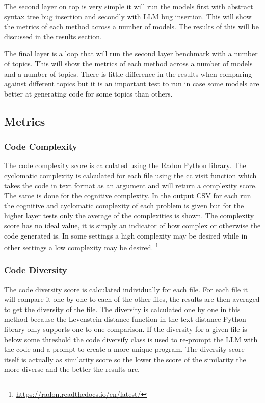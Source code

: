 \documentclass[12pt]{extarticle}
\begin{document}
The second layer on top is very simple it will run the models first with abstract syntax tree bug insertion and secondly with LLM bug insertion. This will show the metrics of each method across a number of models. The results of this will be discussed in the results section.

The final layer is a loop that will run the second layer benchmark with a number of topics. This will show the metrics of each method across a number of models and a number of topics. There is little difference in the results when comparing against different topics but it is an important test to run in case some models are better at generating code for some topics than others.

\subsection{Metrics}
\subsubsection{Code Complexity}

The code complexity score is calculated using the Radon Python library. The cyclomatic complexity \cite{esposito2024} is calculated for each file using the cc visit function which takes the code in text format as an argument and will return a complexity score. The same is done for the cognitive complexity. In the output CSV for each run the cognitive and cyclomatic complexity of each problem is given but for the higher layer tests only the average of the complexities is shown. The complexity score has no ideal value, it is simply an indicator of how complex or otherwise the code generated is. In some settings a high complexity may be desired while in other settings a low complexity may be desired.
\footnote{\url{https://radon.readthedocs.io/en/latest/}}


\subsubsection{Code Diversity}

The code diversity score is calculated individually for each file. For each file it will compare it one by one to each of the other files, the results are then averaged to get the diversity of the file. The diversity is calculated one by one in this method because the Levenstein distance function in the text distance Python library only supports one to one comparison. If the diversity for a given file is below some threshold the code diversify class is used to re-prompt the LLM with the code and a prompt to create a more unique program. The diversity score itself is actually as similarity score so the lower the score of the similarity the more diverse and the better the results are.
\end{document}
